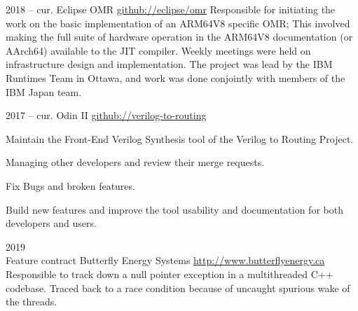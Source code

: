 \documentclass[9.5pt]{developercv} %
\begin{document}

\begin{entrylist}

    \entry
        {2018 -- cur.}
        {Eclipse OMR}
        {\href{https://github.com/eclipse/omr}{github://eclipse/omr}}{ 
            Responsible for initiating the work on the basic implementation of an ARM64V8 specific OMR; This involved making the full suite of hardware operation in the ARM64V8 documentation (or AArch64) available to the JIT compiler. 
            Weekly meetings were held on infrastructure design and implementation. 
            The project was lead by the IBM Runtimes Team in Ottawa, and work was done conjointly with members of the IBM Japan team.
            }

    \entry
        {2017 -- cur.}
        {Odin II}
        {\href{https://github.com/verilog-to-routing/vtr-verilog-to-routing/graphs/contributors}{github://verilog-to-routing}}{ 
            Maintain the Front-End Verilog Synthesis tool of the Verilog to Routing Project.
            \begin{tightemize}
            \item Managing other developers and review their merge requests.
            \item Fix Bugs and broken features.
            \item Build new features and improve the tool usability and documentation for both developers and users.
            \end{tightemize}
            }

    \entry
        {2019 \\{\footnotesize Feature contract}}
        {Butterfly Energy Systems}
        {\href{http://www.butterflyenergy.ca/home.php}{http://www.butterflyenergy.ca}}{ 
            Responsible to track down a null pointer exception in a multithreaded C++ codebase.
            Traced back to a race condition because of uncaught spurious wake of the threads.
            }

\end{entrylist}



\vspace*{\baselineskip}

\end{document}
